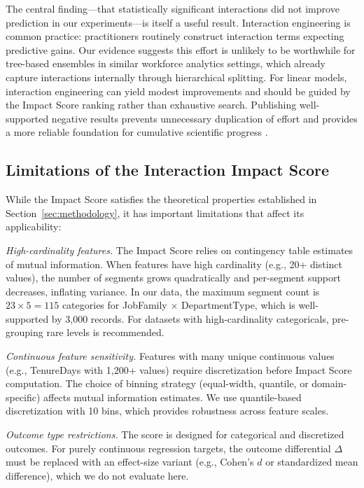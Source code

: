 \documentclass[conference]{IEEEtran}
\begin{document}
The central finding---that statistically significant interactions did not improve prediction in our experiments---is itself a useful result. Interaction engineering is common practice: practitioners routinely construct interaction terms expecting predictive gains. Our evidence suggests this effort is unlikely to be worthwhile for tree-based ensembles in similar workforce analytics settings, which already capture interactions internally through hierarchical splitting. For linear models, interaction engineering can yield modest improvements and should be guided by the Impact Score ranking rather than exhaustive search. Publishing well-supported negative results prevents unnecessary duplication of effort and provides a more reliable foundation for cumulative scientific progress \cite{karl2024embracing}.

\subsection{Limitations of the Interaction Impact Score}
\label{sec:limitations}

While the Impact Score satisfies the theoretical properties established in Section~\ref{sec:methodology}, it has important limitations that affect its applicability:

\textit{High-cardinality features.} The Impact Score relies on contingency table estimates of mutual information. When features have high cardinality (e.g., 20+ distinct values), the number of segments grows quadratically and per-segment support decreases, inflating variance. In our data, the maximum segment count is $23 \times 5 = 115$ categories for JobFamily $\times$ DepartmentType, which is well-supported by 3,000 records. For datasets with high-cardinality categoricals, pre-grouping rare levels is recommended.

\textit{Continuous feature sensitivity.} Features with many unique continuous values (e.g., TenureDays with 1,200+ values) require discretization before Impact Score computation. The choice of binning strategy (equal-width, quantile, or domain-specific) affects mutual information estimates. We use quantile-based discretization with 10 bins, which provides robustness across feature scales.

\textit{Outcome type restrictions.} The score is designed for categorical and discretized outcomes. For purely continuous regression targets, the outcome differential $\Delta$ must be replaced with an effect-size variant (e.g., Cohen's $d$ or standardized mean difference), which we do not evaluate here.
\end{document}
